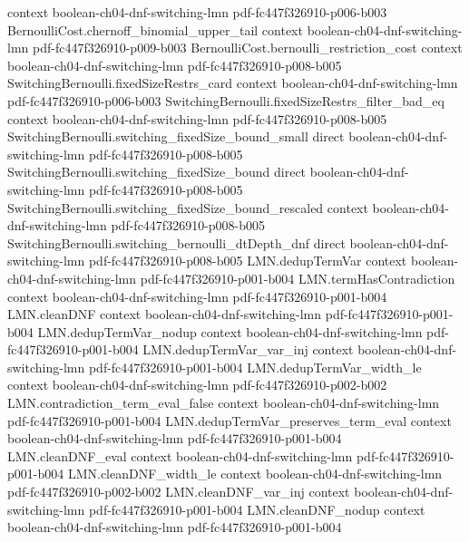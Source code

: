 \begin{lemma}
  {context}
  {boolean-ch04-dnf-switching-lmn}
  {pdf-fc447f326910-p006-b003}
\proofstep
  {BernoulliCost.chernoff_binomial_upper_tail}
  {context}
  {boolean-ch04-dnf-switching-lmn}
  {pdf-fc447f326910-p009-b003}
\proofstep
  {BernoulliCost.bernoulli_restriction_cost}
  {context}
  {boolean-ch04-dnf-switching-lmn}
  {pdf-fc447f326910-p008-b005}
\proofstep
  {SwitchingBernoulli.fixedSizeRestrs_card}
  {context}
  {boolean-ch04-dnf-switching-lmn}
  {pdf-fc447f326910-p006-b003}
\proofstep
  {SwitchingBernoulli.fixedSizeRestrs_filter_bad_eq}
  {context}
  {boolean-ch04-dnf-switching-lmn}
  {pdf-fc447f326910-p008-b005}
\proofstep
  {SwitchingBernoulli.switching_fixedSize_bound_small}
  {direct}
  {boolean-ch04-dnf-switching-lmn}
  {pdf-fc447f326910-p008-b005}
\proofstep
  {SwitchingBernoulli.switching_fixedSize_bound}
  {direct}
  {boolean-ch04-dnf-switching-lmn}
  {pdf-fc447f326910-p008-b005}
\proofstep
  {SwitchingBernoulli.switching_fixedSize_bound_rescaled}
  {context}
  {boolean-ch04-dnf-switching-lmn}
  {pdf-fc447f326910-p008-b005}
\proofstep
  {SwitchingBernoulli.switching_bernoulli_dtDepth_dnf}
  {direct}
  {boolean-ch04-dnf-switching-lmn}
  {pdf-fc447f326910-p008-b005}
\proofstep
  {LMN.dedupTermVar}
  {context}
  {boolean-ch04-dnf-switching-lmn}
  {pdf-fc447f326910-p001-b004}
\proofstep
  {LMN.termHasContradiction}
  {context}
  {boolean-ch04-dnf-switching-lmn}
  {pdf-fc447f326910-p001-b004}
\proofstep
  {LMN.cleanDNF}
  {context}
  {boolean-ch04-dnf-switching-lmn}
  {pdf-fc447f326910-p001-b004}
\proofstep
  {LMN.dedupTermVar_nodup}
  {context}
  {boolean-ch04-dnf-switching-lmn}
  {pdf-fc447f326910-p001-b004}
\proofstep
  {LMN.dedupTermVar_var_inj}
  {context}
  {boolean-ch04-dnf-switching-lmn}
  {pdf-fc447f326910-p001-b004}
\proofstep
  {LMN.dedupTermVar_width_le}
  {context}
  {boolean-ch04-dnf-switching-lmn}
  {pdf-fc447f326910-p002-b002}
\proofstep
  {LMN.contradiction_term_eval_false}
  {context}
  {boolean-ch04-dnf-switching-lmn}
  {pdf-fc447f326910-p001-b004}
\proofstep
  {LMN.dedupTermVar_preserves_term_eval}
  {context}
  {boolean-ch04-dnf-switching-lmn}
  {pdf-fc447f326910-p001-b004}
\proofstep
  {LMN.cleanDNF_eval}
  {context}
  {boolean-ch04-dnf-switching-lmn}
  {pdf-fc447f326910-p001-b004}
\proofstep
  {LMN.cleanDNF_width_le}
  {context}
  {boolean-ch04-dnf-switching-lmn}
  {pdf-fc447f326910-p002-b002}
\proofstep
  {LMN.cleanDNF_var_inj}
  {context}
  {boolean-ch04-dnf-switching-lmn}
  {pdf-fc447f326910-p001-b004}
\proofstep
  {LMN.cleanDNF_nodup}
  {context}
  {boolean-ch04-dnf-switching-lmn}
  {pdf-fc447f326910-p001-b004}
\proofstep

\end{lemma}
